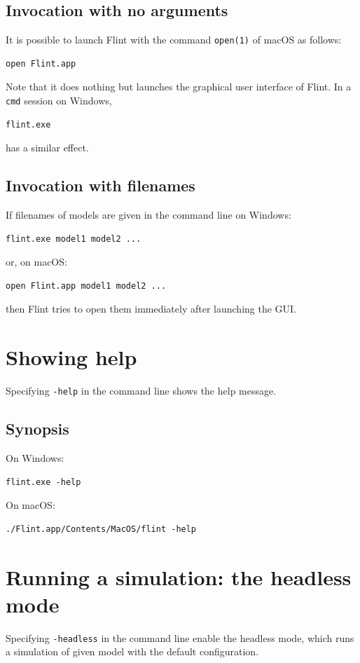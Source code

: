 \documentclass[a4paper,10pt]{report}
\begin{document}
\subsection{Invocation with no arguments}
\label{sec:org82bd718}
It is possible to launch Flint with the command \texttt{open(1)} of macOS as follows:
\begin{verbatim}
open Flint.app
\end{verbatim}
Note that it does nothing but launches the graphical user interface of Flint.
In a \texttt{cmd} session on Windows,
\begin{verbatim}
flint.exe
\end{verbatim}
has a similar effect.

\subsection{Invocation with filenames}
\label{sec:orgd36aedb}
If filenames of models are given in the command line on Windows:
\begin{verbatim}
flint.exe model1 model2 ...
\end{verbatim}
or, on macOS:
\begin{verbatim}
open Flint.app model1 model2 ...
\end{verbatim}
then Flint tries to open them immediately after launching the GUI.

\section{Showing help}
\label{sec:org186ffa5}
Specifying \texttt{-help} in the command line shows the help message.

\subsection{Synopsis}
\label{sec:orgbd11071}
On Windows:
\begin{verbatim}
flint.exe -help
\end{verbatim}
On macOS:
\begin{verbatim}
./Flint.app/Contents/MacOS/flint -help
\end{verbatim}

\section{Running a simulation: the headless mode}
\label{sec:org8ddb2a9}
Specifying \texttt{-headless} in the command line enable the headless mode, which
runs a simulation of given model with the default configuration.
\end{document}
